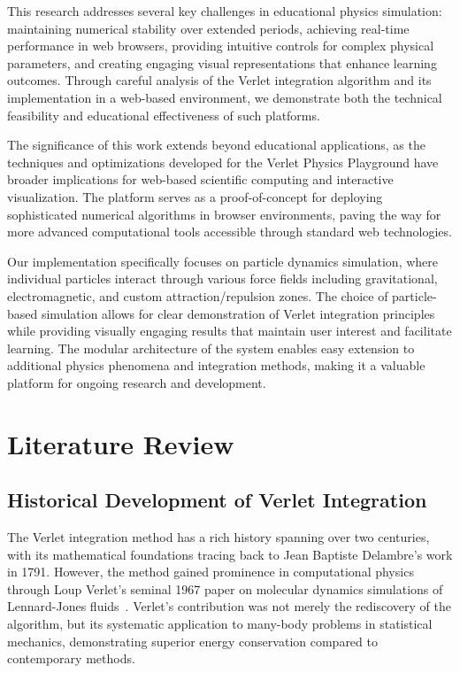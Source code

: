 \documentclass[12pt,journal,onecolumn]{IEEEtran}
\begin{document}
This research addresses several key challenges in educational physics simulation: maintaining numerical stability over extended periods, achieving real-time performance in web browsers, providing intuitive controls for complex physical parameters, and creating engaging visual representations that enhance learning outcomes. Through careful analysis of the Verlet integration algorithm and its implementation in a web-based environment, we demonstrate both the technical feasibility and educational effectiveness of such platforms.

The significance of this work extends beyond educational applications, as the techniques and optimizations developed for the Verlet Physics Playground have broader implications for web-based scientific computing and interactive visualization. The platform serves as a proof-of-concept for deploying sophisticated numerical algorithms in browser environments, paving the way for more advanced computational tools accessible through standard web technologies.

Our implementation specifically focuses on particle dynamics simulation, where individual particles interact through various force fields including gravitational, electromagnetic, and custom attraction/repulsion zones. The choice of particle-based simulation allows for clear demonstration of Verlet integration principles while providing visually engaging results that maintain user interest and facilitate learning. The modular architecture of the system enables easy extension to additional physics phenomena and integration methods, making it a valuable platform for ongoing research and development.

\section{Literature Review}

\subsection{Historical Development of Verlet Integration}
The Verlet integration method has a rich history spanning over two centuries, with its mathematical foundations tracing back to Jean Baptiste Delambre's work in 1791. However, the method gained prominence in computational physics through Loup Verlet's seminal 1967 paper on molecular dynamics simulations of Lennard-Jones fluids~\cite{verlet1967}. Verlet's contribution was not merely the rediscovery of the algorithm, but its systematic application to many-body problems in statistical mechanics, demonstrating superior energy conservation compared to contemporary methods.
\end{document}
